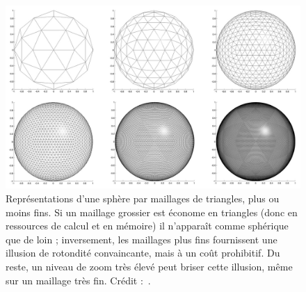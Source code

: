 	\begin{figure}[H]
    	\centering
    	\includegraphics[width=\textwidth]{figures/ch1/spheremeshes}
    	\caption{Représentations d'une sphère par maillages de triangles, plus ou moins fins. Si un maillage grossier est économe en triangles (donc en ressources de calcul et en mémoire) il n'apparaît comme sphérique que de loin ; inversement, les maillages plus fins fournissent une illusion de rotondité convaincante, mais à un coût prohibitif. Du reste, un niveau de zoom très élevé peut briser cette illusion, même sur un maillage très fin. Crédit :~\cite{seo2010heat}.}
    	\label{fig:spheremeshes}
	\end{figure}
		
